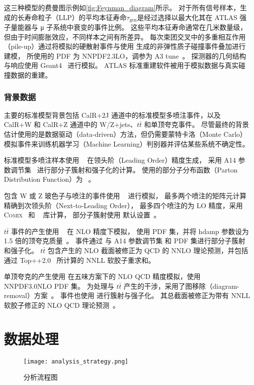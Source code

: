 这三种模型的费曼图示例如\autoref{fig:Feynman_diagram}所示。
对于所有信号样本，生成的长寿命粒子（LLP）的平均本征寿命$\tau_{\text{gen}}$是经过选择以最大化其在 ATLAS 强子量能器与 μ 子系统中衰变的事件比例。
这些平均本征寿命通常在几米数量级，但由于时间膨胀效应，不同样本之间有所差异。
每次束团交叉中的多重相互作用（pile-up）通过将模拟的硬散射事件与使用  生成的非弹性质子碰撞事件叠加进行建模，
所使用的 PDF 为 NNPDF2.3LO，调参为 A3 tune~\cite{ATL-PHYS-PUB-2016-017}。
探测器的几何结构与响应使用 Geant4~\cite{GEANT4:2002zbu} 进行模拟。
ATLAS 标准重建软件被用于模拟数据与真实碰撞数据的重建。

\subsubsection{背景数据}
主要的标准模型背景包括 CalR+2J 通道中的标准模型多喷注事件，以及 CalR+W 和 CalR+Z 通道中的 W/Z+jets、$t\bar{t}$ 和单顶夸克事件。
尽管最终的背景估计使用的是数据驱动（data-driven）方法，但仍需要蒙特卡洛（Monte Carlo）模拟事件来训练机器学习（Machine Learning）判别器并评估某些系统不确定性。

标准模型多喷注样本使用 ~\cite{pythia} 在领头阶（Leading Order）精度生成，
采用 A14 参数调节集~\cite{Pythia_tunes} 进行部分子簇射和强子化的计算。
使用的部分子分布函数（Parton Distribution Function）为 \NNPDF[2.3lo]~\cite{parton_PDF}。

包含 W 或 Z 玻色子与喷注的事件使用 \Sherpa[v2.2.1]~\cite{Sherpa} 进行模拟，
最多两个喷注的矩阵元计算精确到次领头阶（Next-to-Leading Order），
最多四个喷注的为 LO 精度，采用 \textsc{Comix}~\cite{Comix} 和 \OPENLOOPS~\cite{Open_Loops} 库计算，
部分子簇射使用 \Sherpa 默认设置~\cite{parton_shower}。

$t\bar{t}$ 事件的产生使用 \POWHEGBOX[v2]~\cite{POWHEG_BOX} 在 NLO 精度下模拟，
使用 \NNPDF[3.0NLO] PDF 集，并将 hdamp 参数设为 1.5 倍的顶夸克质量~\cite{ATL-PHYS-PUB-2016-020}。
事件通过 \Pythia[8.230] 与 A14 参数调节集 和 \NNPDF[2.3LO] PDF 集进行部分子簇射和强子化。
$t\bar{t}$ 包含产生的 NLO 截面被修正为 QCD 的 NNLO 理论预测，并包括通过 Top++2.0~\cite{Beneke:2011mq} 所计算的 NNLL 软胶子重求和。

单顶夸克的产生使用 \POWHEGBOX[v2] 在五味方案下的 NLO QCD 精度模拟，使用 NNPDF3.0NLO PDF 集。
为处理与 $t\bar{t}$ 产生的干涉，采用了图移除（diagram-removal）方案~\cite{Frixione:2008yi}。
事件也使用  进行簇射与强子化。
其总截面被修正为带有 NNLL 软胶子修正的 NLO QCD 理论预测~\cite{Aliev:2010zk}。


\section{数据处理}
\begin{figure}[ht]
    \centering
    \texttt{[image: analysis\_strategy.png]}
    \caption{分析流程图}
    \label{fig:analysis_strategy}
\end{figure}

